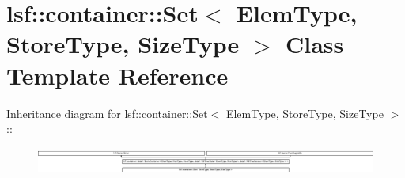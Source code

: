 \hypertarget{classlsf_1_1container_1_1Set}{
\section{lsf::container::Set$<$ ElemType, StoreType, SizeType $>$ Class Template Reference}
\label{classlsf_1_1container_1_1Set}
}
Inheritance diagram for lsf::container::Set$<$ ElemType, StoreType, SizeType $>$::\begin{figure}[H]
\begin{center}
\leavevmode
\includegraphics[height=0.885142cm]{classlsf_1_1container_1_1Set}
\end{center}
\end{figure}
